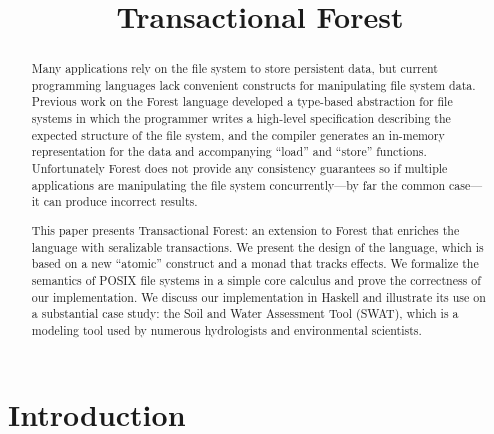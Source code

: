 \documentclass[nocopyrightspace]{sigplanconf}
\title{Transactional Forest}
\begin{document}
\maketitle

\begin{abstract}
Many applications rely on the file system to store persistent data,
but current programming languages lack convenient constructs for
manipulating file system data. Previous work on the Forest language
developed a type-based abstraction for file systems in which the
programmer writes a high-level specification describing the expected
structure of the file system, and the compiler generates an in-memory
representation for the data and accompanying ``load'' and ``store''
functions. Unfortunately Forest does not provide any consistency
guarantees so if multiple applications are manipulating the file
system concurrently---by far the common case---it can produce
incorrect results.

This paper presents Transactional Forest: an extension to Forest that
enriches the language with seralizable transactions. We present the
design of the language, which is based on a new ``atomic'' construct
and a monad that tracks effects. We formalize the semantics of POSIX
file systems in a simple core calculus and prove the correctness of
our implementation. We discuss our implementation in Haskell and
illustrate its use on a substantial case study: the Soil and Water
Assessment Tool (SWAT), which is a modeling tool used by numerous
hydrologists and environmental scientists.
\end{abstract}

\section{Introduction}
\label{sec:introduction}


\end{document}
